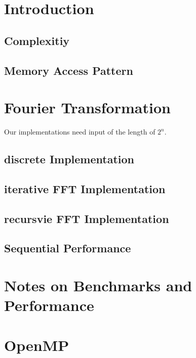 \documentclass[12pt,a4paper,titlepage,oneside]{scrartcl}
\begin{document}
\maketitle
\setcounter{section}{0}
\setcounter{tocdepth}{2}
\tableofcontents
\pagebreak
%
%
\section{Introduction}
	\subsection{Complexitiy}
	
	\pagebreak
	\subsection{Memory Access Pattern}
	
\section{Fourier Transformation}
	Our implementations need input of the length of \(2^{n}\).
	\subsection{discrete Implementation}
	
	\subsection{iterative FFT Implementation}
	
	\subsection{recursvie FFT Implementation}
	
	\subsection{Sequential Performance}	
	

\section{Notes on Benchmarks and Performance}
	
\section{OpenMP}
\end{document}
